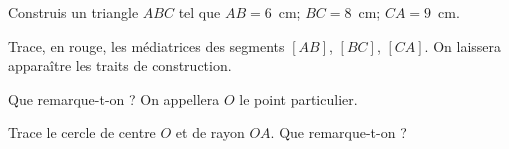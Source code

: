 \begin{myenumerate}
\item Construis un triangle $ABC$ tel que $AB=6$~cm; $BC=8$~cm;
$CA=9$~cm.
\item Trace, en rouge, les médiatrices des segments
$[AB]$, $[BC]$, $[CA]$. On laissera apparaître les traits de
construction.
\item Que remarque-t-on ? On appellera $O$ le point particulier.
\item Trace le cercle de centre $O$ et de rayon $OA$. Que
remarque-t-on ?
\end{myenumerate}

